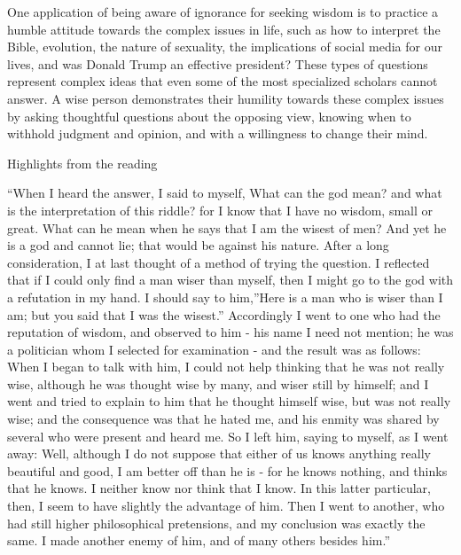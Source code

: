 \documentclass[
]{book}
\begin{document}
One application of being aware of ignorance for seeking wisdom is to practice a humble attitude towards the complex issues in life, such as how to interpret the Bible, evolution, the nature of sexuality, the implications of social media for our lives, and was Donald Trump an effective president? These types of questions represent complex ideas that even some of the most specialized scholars cannot answer. A wise person demonstrates their humility towards these complex issues by asking thoughtful questions about the opposing view, knowing when to withhold judgment and opinion, and with a willingness to change their mind.

Highlights from the reading

``When I heard the answer, I said to myself, What can the god mean? and what is the interpretation of this riddle? for I know that I have no wisdom, small or great. What can he mean when he says that I am the wisest of men? And yet he is a god and cannot lie; that would be against his nature. After a long consideration, I at last thought of a method of trying the question. I reflected that if I could only find a man wiser than myself, then I might go to the god with a refutation in my hand. I should say to him,''Here is a man who is wiser than I am; but you said that I was the wisest.'' Accordingly I went to one who had the reputation of wisdom, and observed to him - his name I need not mention; he was a politician whom I selected for examination - and the result was as follows: When I began to talk with him, I could not help thinking that he was not really wise, although he was thought wise by many, and wiser still by himself; and I went and tried to explain to him that he thought himself wise, but was not really wise; and the consequence was that he hated me, and his enmity was shared by several who were present and heard me. So I left him, saying to myself, as I went away: Well, although I do not suppose that either of us knows anything really beautiful and good, I am better off than he is - for he knows nothing, and thinks that he knows. I neither know nor think that I know. In this latter particular, then, I seem to have slightly the advantage of him. Then I went to another, who had still higher philosophical pretensions, and my conclusion was exactly the same. I made another enemy of him, and of many others besides him.''
\end{document}
